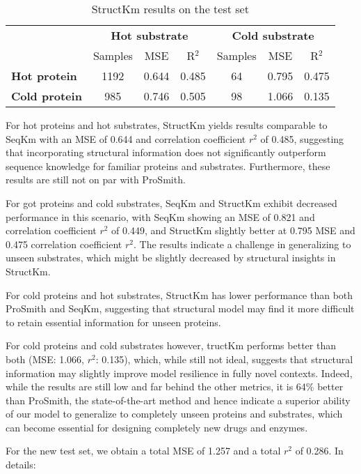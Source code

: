  \begin{table}[ht]
  \centering
  \begin{tabular}{lcccccc}
  \hline
   & \multicolumn{3}{c}{\textbf{Hot substrate}} & \multicolumn{3}{c}{\textbf{Cold substrate}} \\
   & Samples & MSE & R\(^2\) & Samples & MSE & R\(^2\) \\ \hline
  \textbf{Hot protein}  & 1192 & 0.644 & 0.485 & 64 & 0.795 & 0.475 \\
  \textbf{Cold protein} & 985 & 0.746 & 0.505 & 98 & 1.066 & 0.135 \\ \hline
  \end{tabular}
  \caption{StructKm results on the test set}
  \label{tab:structkm_results}
\end{table}

For hot proteins and hot substrates, StructKm yields results comparable to SeqKm with an MSE of 0.644 and correlation coefficient $r^2$ of 0.485, suggesting that incorporating structural information does not significantly outperform sequence knowledge for familiar proteins and substrates. Furthermore, these results are still not on par with ProSmith.

For got proteins and cold substrates, SeqKm and StructKm exhibit decreased performance in this scenario, with SeqKm showing an MSE of 0.821 and correlation coefficient $r^2$ of 0.449, and StructKm slightly better at 0.795 MSE and 0.475 correlation coefficient $r^2$. The results indicate a challenge in generalizing to unseen substrates, which might be slightly decreased by structural insights in StructKm.

For cold proteins and hot substrates, StructKm has lower performance than both ProSmith and SeqKm, suggesting that structural model may find it more difficult to retain essential information for unseen proteins. 

For cold proteins and cold substrates however, tructKm performs better than both (MSE: 1.066, $r^2$: 0.135), which, while still not ideal, suggests that structural information may slightly improve model resilience in fully novel contexts. Indeed, while the results are still low and far behind the other metrics, it is 64\% better than ProSmith, the state-of-the-art method and hence indicate a superior ability of our model to generalize to completely unseen proteins and substrates, which can become essential for designing completely new drugs and enzymes. 

For the new test set, we obtain a total MSE of 1.257 and a total $r^2$ of 0.286. In details:

